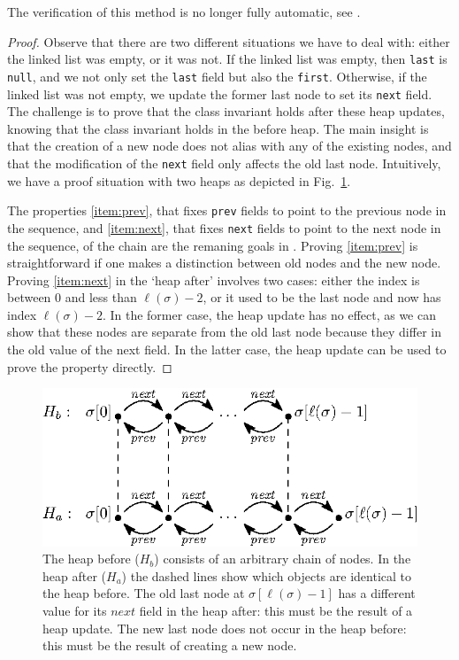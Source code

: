 \documentclass[runningheads]{llncs}
\theoremstyle{remark}
\begin{document}
The verification of this method is no longer fully automatic, see .

\begin{proof}
Observe that there are two different situations we have to deal with: either the linked list was empty, or it was not. If the linked list was empty, then \texttt{last} is \texttt{null}, and we not only set the \texttt{last} field but also the \texttt{first}. Otherwise, if the linked list was not empty, we update the former last node to set its \texttt{next} field. The challenge is to prove that the class invariant holds after these heap updates, knowing that the class invariant holds in the before heap. The main insight is that the creation of a new node does not alias with any of the existing nodes, and that the modification of the \texttt{next} field only affects the old last node. Intuitively, we have a proof situation with two heaps as depicted in Fig.~\ref{fig:linklast}.

The properties \ref{item:prev}, that fixes \texttt{prev} fields to point to the previous node in the sequence, and \ref{item:next}, that fixes \texttt{next} fields to point to the next node in the sequence, of the chain are the remaning goals in . Proving \ref{item:prev} is straightforward if one makes a distinction between old nodes and the new node. Proving \ref{item:next} in the `heap after' involves two cases: either the index is between $0$ and less than $\ell(\sigma)-2$, or it used to be the last node and now has index $\ell(\sigma)-2$. In the former case, the heap update has no effect, as we can show that these nodes are separate from the old last node because they differ in the old value of the next field. In the latter case, the heap update can be used to prove the property directly.
\end{proof}

\begin{figure}
   \vspace*{-12pt}
   \centering
   \includegraphics[scale=1]{figures/linkedlist-linklast.eps}
   \caption{The heap before ($H_b$) consists of an arbitrary chain of nodes. In the heap after ($H_a$) the dashed lines show which objects are identical to the heap before. The old last node at $\sigma[\ell(\sigma)-1]$ has a different value for its $\mathit{next}$ field in the heap after: this must be the result of a heap update. The new last node does not occur in the heap before: this must be the result of creating a new node.}
   \vspace*{-12pt}
   \label{fig:linklast}
\end{figure}
\end{document}
